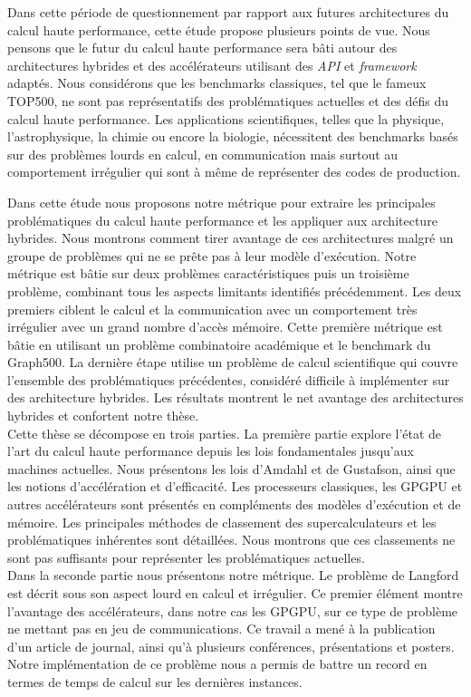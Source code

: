 \documentclass[12pt,a4paper]{report}
\begin{document}
Dans cette période de questionnement par rapport aux futures architectures du calcul haute performance, cette étude propose plusieurs points de vue. 
Nous pensons que le futur du calcul haute performance sera bâti autour des architectures hybrides et des accélérateurs utilisant des \textit{API} et \textit{framework} adaptés. 
Nous considérons que les benchmarks classiques, tel que le fameux TOP500, ne sont pas représentatifs des problématiques actuelles et des défis du calcul haute performance.
Les applications scientifiques, telles que la physique, l'astrophysique, la chimie ou encore la biologie, nécessitent des benchmarks basés sur des problèmes lourds en calcul, en communication mais surtout au comportement irrégulier qui sont à même de représenter des codes de production.

Dans cette étude nous proposons notre métrique pour extraire les principales problématiques du calcul haute performance et les appliquer aux architecture hybrides. 
Nous montrons comment tirer avantage de ces architectures malgré un groupe de problèmes qui ne se prête pas à leur modèle d'exécution.
Notre métrique est bâtie sur deux problèmes caractéristiques puis un troisième problème, combinant tous les aspects limitants identifiés précédemment.
Les deux premiers ciblent le calcul et la communication avec un comportement très irrégulier avec un grand nombre d'accès mémoire.
Cette première métrique est bâtie en utilisant un problème combinatoire académique et le benchmark du Graph500.
La dernière étape utilise un problème de calcul scientifique qui couvre l'ensemble des problématiques précédentes, considéré difficile à implémenter sur des architecture hybrides. 
Les résultats montrent le net avantage des architectures hybrides et confortent notre thèse. \\

Cette thèse se décompose en trois parties.
La première partie explore l'état de l'art du calcul haute performance depuis les lois fondamentales jusqu'aux machines actuelles. 
Nous présentons les lois d'Amdahl et de Gustafson, ainsi que les notions d'accélération et d'efficacité.  
Les processeurs classiques, les GPGPU et autres accélérateurs sont présentés en compléments des modèles d'exécution et de mémoire. 
Les principales méthodes de classement des supercalculateurs et les problématiques inhérentes sont détaillées.
Nous montrons que ces classements ne sont pas suffisants pour représenter les problématiques actuelles.\\

Dans la seconde partie nous présentons notre métrique. 
Le problème de Langford est décrit sous son aspect lourd en calcul et irrégulier. 
Ce premier élément montre l'avantage des accélérateurs, dans notre cas les GPGPU, sur ce type de problème ne mettant pas en jeu de communications.
Ce travail a mené à la publication d'un article de journal\cite{krajecki2016many}, ainsi qu'à plusieurs conférences, présentations et posters\cite{deleau2014towards,j2016resolution,jaillet2014Langford}.
Notre implémentation de ce problème nous a permis de battre un record en termes de temps de calcul sur les dernières instances.
\end{document}
